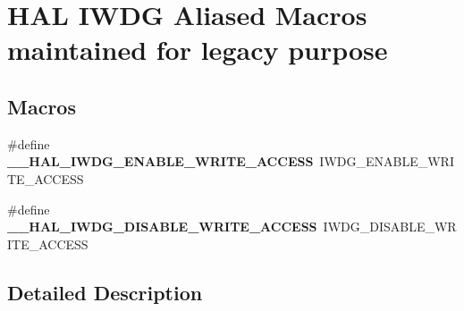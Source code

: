 \hypertarget{group___h_a_l___i_w_d_g___aliased___macros}{}\section{H\+AL I\+W\+DG Aliased Macros maintained for legacy purpose}
\label{group___h_a_l___i_w_d_g___aliased___macros}
\subsection*{Macros}
\begin{DoxyCompactItemize}
\item 
\mbox{\label{group___h_a_l___i_w_d_g___aliased___macros_ga6854cc0a200e2e37d927e76f643a8f6a}} 
\#define {\bfseries \+\_\+\+\_\+\+H\+A\+L\+\_\+\+I\+W\+D\+G\+\_\+\+E\+N\+A\+B\+L\+E\+\_\+\+W\+R\+I\+T\+E\+\_\+\+A\+C\+C\+E\+SS}~I\+W\+D\+G\+\_\+\+E\+N\+A\+B\+L\+E\+\_\+\+W\+R\+I\+T\+E\+\_\+\+A\+C\+C\+E\+SS
\item 
\mbox{\label{group___h_a_l___i_w_d_g___aliased___macros_gaf3dfc0b4463f19c4ff31b02ae039861a}} 
\#define {\bfseries \+\_\+\+\_\+\+H\+A\+L\+\_\+\+I\+W\+D\+G\+\_\+\+D\+I\+S\+A\+B\+L\+E\+\_\+\+W\+R\+I\+T\+E\+\_\+\+A\+C\+C\+E\+SS}~I\+W\+D\+G\+\_\+\+D\+I\+S\+A\+B\+L\+E\+\_\+\+W\+R\+I\+T\+E\+\_\+\+A\+C\+C\+E\+SS
\end{DoxyCompactItemize}


\subsection{Detailed Description}
